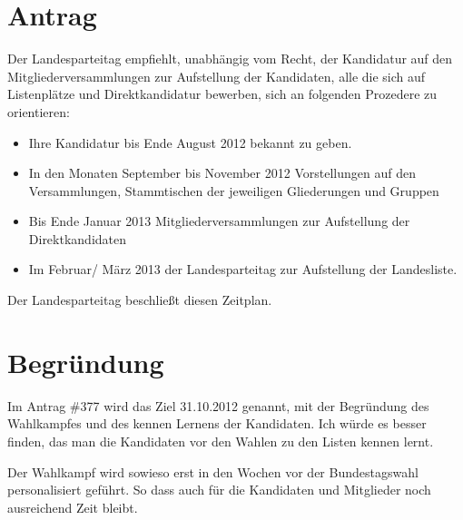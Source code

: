 \section{Antrag}

Der Landesparteitag empfiehlt, unabhängig vom Recht, der Kandidatur auf den Mitgliederversammlungen zur Aufstellung der Kandidaten, alle die sich auf Listenplätze und Direktkandidatur bewerben, sich an folgenden Prozedere zu orientieren:

\begin{itemize}
\item
  Ihre Kandidatur bis Ende August 2012 bekannt zu geben.
\end{itemize}
\begin{itemize}
\item
  In den Monaten September bis November 2012 Vorstellungen auf den Versammlungen, Stammtischen der jeweiligen Gliederungen und Gruppen
\end{itemize}
\begin{itemize}
\item
  Bis Ende Januar 2013 Mitgliederversammlungen zur Aufstellung der Direktkandidaten
\end{itemize}
\begin{itemize}
\item
  Im Februar/ März 2013 der Landesparteitag zur Aufstellung der Landesliste.
\end{itemize}
Der Landesparteitag beschließt diesen Zeitplan.

\section{Begründung}

Im Antrag \#377 wird das Ziel 31.10.2012 genannt, mit der Begründung des Wahlkampfes und des kennen Lernens der Kandidaten. Ich würde es besser finden, das man die Kandidaten vor den Wahlen zu den Listen kennen lernt.

Der Wahlkampf wird sowieso erst in den Wochen vor der Bundestagswahl personalisiert geführt. So dass auch für die Kandidaten und Mitglieder noch ausreichend Zeit bleibt.
